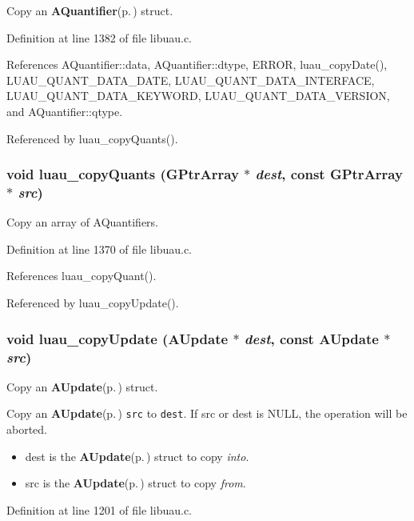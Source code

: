 Copy an {\bf AQuantifier}{\rm (p.\,\pageref{structAQuantifier})} struct. 



Definition at line 1382 of file libuau.c.

References AQuantifier::data, AQuantifier::dtype, ERROR, luau\_\-copy\-Date(), LUAU\_\-QUANT\_\-DATA\_\-DATE, LUAU\_\-QUANT\_\-DATA\_\-INTERFACE, LUAU\_\-QUANT\_\-DATA\_\-KEYWORD, LUAU\_\-QUANT\_\-DATA\_\-VERSION, and AQuantifier::qtype.

Referenced by luau\_\-copy\-Quants().
\subsubsection{\setlength{\rightskip}{0pt plus 5cm}void luau\_\-copy\-Quants (GPtr\-Array $\ast$ {\em dest}, const GPtr\-Array $\ast$ {\em src})}\label{libuau_8c_a48}


Copy an array of AQuantifiers. 



Definition at line 1370 of file libuau.c.

References luau\_\-copy\-Quant().

Referenced by luau\_\-copy\-Update().
\subsubsection{\setlength{\rightskip}{0pt plus 5cm}void luau\_\-copy\-Update ({\bf AUpdate} $\ast$ {\em dest}, const {\bf AUpdate} $\ast$ {\em src})}\label{libuau_8c_a43}


Copy an {\bf AUpdate}{\rm (p.\,\pageref{structAUpdate})} struct. 

Copy an {\bf AUpdate}{\rm (p.\,\pageref{structAUpdate})} {\tt src} to {\tt dest}. If src or dest is NULL, the operation will be aborted.

\begin{itemize}
\item dest is the {\bf AUpdate}{\rm (p.\,\pageref{structAUpdate})} struct to copy {\em into\/}. \item src is the {\bf AUpdate}{\rm (p.\,\pageref{structAUpdate})} struct to copy {\em from\/}. \end{itemize}


Definition at line 1201 of file libuau.c.


